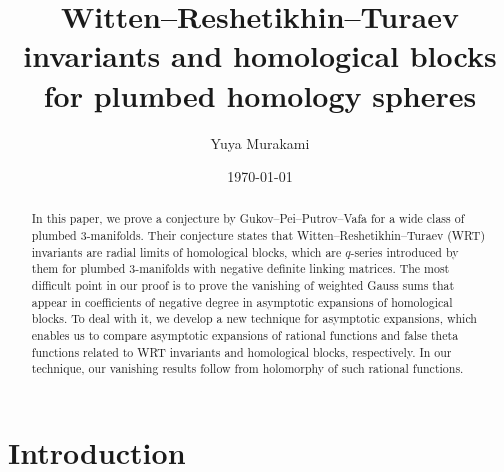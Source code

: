 \documentclass[11pt,a4paper,lualatex]{amsart}
\numberwithin{equation}{section} %
\begin{document}


\title[WRT invariants and homological blocks for plumbed homology spheres]{Witten--Reshetikhin--Turaev invariants and homological blocks for plumbed homology spheres}
\author[Y. Murakami]{Yuya Murakami}
\address{Faculty of Mathematics, Kyushu University, 744, Motooka, Nishi-ku, Fukuoka, 819-0395, Japan}


\date{\today}

\maketitle


\begin{abstract}
	In this paper, we prove a conjecture by Gukov--Pei--Putrov--Vafa for a wide class of plumbed $ 3 $-manifolds.
	Their conjecture states that Witten--Reshetikhin--Turaev (WRT) invariants are radial limits of homological blocks, which are $ q $-series introduced by them for plumbed $ 3 $-manifolds with negative definite linking matrices.
	The most difficult point in our proof is to prove the vanishing of weighted Gauss sums that appear in coefficients of negative degree in asymptotic expansions of homological blocks.
	To deal with it, we develop a new technique for asymptotic expansions, which enables us to compare asymptotic expansions of rational functions and false theta functions related to WRT invariants and homological blocks, respectively.
	In our technique, our vanishing results follow from holomorphy of such rational functions.
\end{abstract}


\tableofcontents


\section{Introduction} \label{sec:intro}
\end{document}
